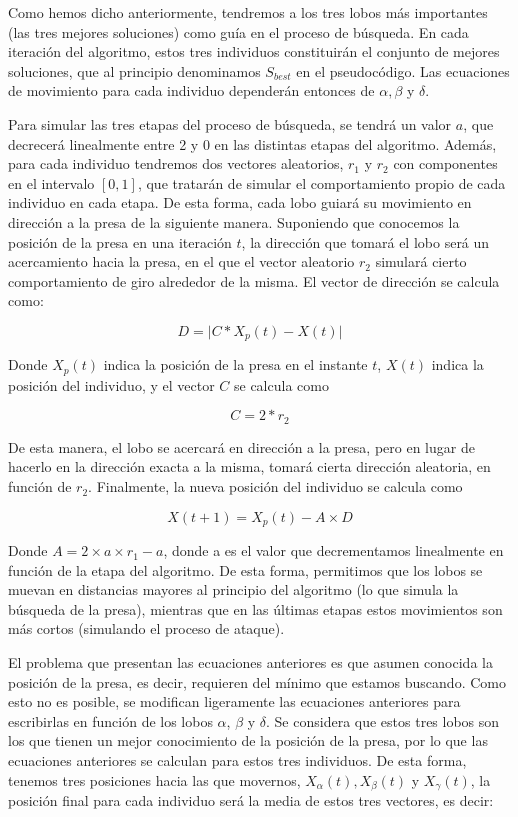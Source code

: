\documentclass[
  a4paper,
,tablecaptionabove
]{scrartcl}
\begin{document}
Como hemos dicho anteriormente, tendremos a los tres lobos más
importantes (las tres mejores soluciones) como guía en el proceso de
búsqueda. En cada iteración del algoritmo, estos tres individuos
constituirán el conjunto de mejores soluciones, que al principio
denominamos \(S_{best}\) en el pseudocódigo. Las ecuaciones de
movimiento para cada individuo dependerán entonces de \(\alpha, \beta\)
y \(\delta\).

Para simular las tres etapas del proceso de búsqueda, se tendrá un valor
\(a\), que decrecerá linealmente entre 2 y 0 en las distintas etapas del
algoritmo. Además, para cada individuo tendremos dos vectores
aleatorios, \(r_1\) y \(r_2\) con componentes en el intervalo \([0,1]\),
que tratarán de simular el comportamiento propio de cada individuo en
cada etapa. De esta forma, cada lobo guiará su movimiento en dirección a
la presa de la siguiente manera. Suponiendo que conocemos la posición de
la presa en una iteración \(t\), la dirección que tomará el lobo será un
acercamiento hacia la presa, en el que el vector aleatorio \(r_2\)
simulará cierto comportamiento de giro alrededor de la misma. El vector
de dirección se calcula como:

\[ D = \lvert C*X_p(t) - X(t) \rvert \]

Donde \(X_p(t)\) indica la posición de la presa en el instante \(t\),
\(X(t)\) indica la posición del individuo, y el vector \(C\) se calcula
como

\[ C = 2*r_2 \]

De esta manera, el lobo se acercará en dirección a la presa, pero en
lugar de hacerlo en la dirección exacta a la misma, tomará cierta
dirección aleatoria, en función de \(r_2\). Finalmente, la nueva
posición del individuo se calcula como

\[ X(t+1) = X_p(t) - A \times D \]

Donde \(A = 2 \times a \times r_1 - a\), donde a es el valor que
decrementamos linealmente en función de la etapa del algoritmo. De esta
forma, permitimos que los lobos se muevan en distancias mayores al
principio del algoritmo (lo que simula la búsqueda de la presa),
mientras que en las últimas etapas estos movimientos son más cortos
(simulando el proceso de ataque).

El problema que presentan las ecuaciones anteriores es que asumen
conocida la posición de la presa, es decir, requieren del mínimo que
estamos buscando. Como esto no es posible, se modifican ligeramente las
ecuaciones anteriores para escribirlas en función de los lobos
\(\alpha\), \(\beta\) y \(\delta\). Se considera que estos tres lobos
son los que tienen un mejor conocimiento de la posición de la presa, por
lo que las ecuaciones anteriores se calculan para estos tres individuos.
De esta forma, tenemos tres posiciones hacia las que movernos,
\(X_{\alpha}(t), X_{\beta}(t)\) y \(X_{\gamma}(t)\), la posición final
para cada individuo será la media de estos tres vectores, es decir:
\end{document}
